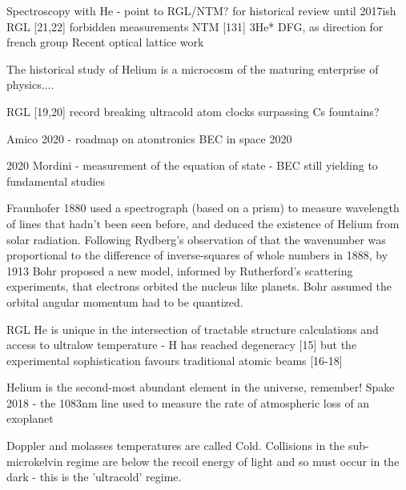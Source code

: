 		Spectroscopy with He - point to RGL/NTM? for historical review until 2017ish
			RGL [21,22] forbidden measurements  
		NTM [131] 3He* DFG, as direction for french group 
		Recent optical lattice work
			
The historical study of Helium is a microcosm of the maturing enterprise of physics....

	RGL [19,20] record breaking ultracold atom clocks surpassing Cs fountains? 


	Amico 2020 - roadmap on atomtronics
	BEC in space 2020

	2020 Mordini - measurement of the equation of state - BEC still yielding to fundamental studies

	\cite{FootAtomic}Fraunhofer 1880 used a spectrograph (based on a prism) to measure wavelength of lines that hadn't been seen before, and deduced the existence of Helium from solar radiation.
Following Rydberg's observation of that the wavenumber was proportional to the difference of inverse-squares of whole numbers in 1888, by 1913 Bohr proposed a new model, informed by Rutherford's scattering experiments, that electrons orbited the nucleus like planets. Bohr assumed the orbital angular momentum had to be quantized.

RGL He is unique in the intersection of tractable structure calculations and access to ultralow temperature - H has reached degeneracy [15] but the experimental sophistication favours traditional atomic beams [16-18] 

Helium is the second-most abundant element in the universe, remember!
	Spake 2018 - the 1083nm line used to measure the rate of atmospheric loss of an exoplanet


	Doppler and molasses temperatures are called Cold. Collisions in the sub-microkelvin regime are below the recoil energy of light and so must occur in the dark - this is the 'ultracold' regime.
	
